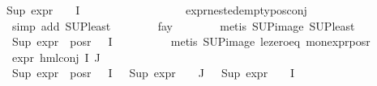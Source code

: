 \begin{isabellebody}
{\isachardoublequoteopen}Sup\ {\isacharparenleft}{\kern0pt}{\isacharparenleft}{\kern0pt}expr{\isacharunderscore}{\kern0pt}{}\ {\isasymcirc}\ {\isasymPhi}{\isacharparenright}{\kern0pt}\ {\isacharbackquote}{\kern0pt}\ I{\isacharparenright}{\kern0pt}\ {\isasymle}\ {}{\isachardoublequoteclose}\isanewline
\ \ \ \ \ \ \isamarkupfalse%
\ {}\isanewline
\ \ \ \ \ \ \isamarkupfalse%
\ expr{\isacharunderscore}{\kern0pt}nested{\isacharunderscore}{\kern0pt}empty{\isacharunderscore}{\kern0pt}pos{\isacharunderscore}{\kern0pt}conj\isanewline
\ \ \ \ \ \ \isamarkupfalse%
\ {\isacharparenleft}{\kern0pt}simp\ add{\isacharcolon}{\kern0pt}\ SUP{\isacharunderscore}{\kern0pt}least{\isacharparenright}{\kern0pt}\isanewline
\ \ \ \ \ \ \isamarkupfalse%
\ fa{\isacharunderscore}{\kern0pt}y\isanewline
\ \ \ \ \ \ \isamarkupfalse%
\ {\isacharparenleft}{\kern0pt}metis\ SUP{\isacharunderscore}{\kern0pt}image\ SUP{\isacharunderscore}{\kern0pt}least{\isacharparenright}{\kern0pt}{\isacharplus}{\kern0pt}\isanewline
\isanewline
\ \ \ \ \isamarkupfalse%
\ {\isachardoublequoteopen}Sup\ {\isacharparenleft}{\kern0pt}expr{\isacharunderscore}{\kern0pt}{}\ {\isacharbackquote}{\kern0pt}\ pos{\isacharunderscore}{\kern0pt}r\ {\isacharparenleft}{\kern0pt}{\isasymPhi}\ {\isacharbackquote}{\kern0pt}\ I{\isacharparenright}{\kern0pt}{\isacharparenright}{\kern0pt}\ {\isasymle}\ {}{\isachardoublequoteclose}\isanewline
\ \ \ \ \ \ \isamarkupfalse%
\ {\isacharparenleft}{\kern0pt}metis\ SUP{\isacharunderscore}{\kern0pt}image\ le{\isacharunderscore}{\kern0pt}zero{\isacharunderscore}{\kern0pt}eq\ mon{\isacharunderscore}{\kern0pt}expr{\isacharunderscore}{\kern0pt}{}{\isacharunderscore}{\kern0pt}pos{\isacharunderscore}{\kern0pt}r{\isacharparenright}{\kern0pt}\isanewline
\isanewline
\ \ \ \ \isamarkupfalse%
\ {\isachardoublequoteopen}expr{\isacharunderscore}{\kern0pt}{}\ {\isacharparenleft}{\kern0pt}hml{\isacharunderscore}{\kern0pt}conj\ I\ J\ {\isasymPhi}{\isacharparenright}{\kern0pt}\ {\isasymle}\ {}{\isachardoublequoteclose}\isanewline
\ \ \ \ \ \ \isamarkupfalse%
\ {\isacartoucheopen}Sup\ {\isacharparenleft}{\kern0pt}expr{\isacharunderscore}{\kern0pt}{}\ {\isacharbackquote}{\kern0pt}\ pos{\isacharunderscore}{\kern0pt}r\ {\isacharparenleft}{\kern0pt}{\isasymPhi}\ {\isacharbackquote}{\kern0pt}\ I{\isacharparenright}{\kern0pt}{\isacharparenright}{\kern0pt}\ {\isasymle}\ {}{\isacartoucheclose}\ {\isacartoucheopen}Sup\ {\isacharparenleft}{\kern0pt}{\isacharparenleft}{\kern0pt}expr{\isacharunderscore}{\kern0pt}{}\ {\isasymcirc}\ {\isasymPhi}{\isacharparenright}{\kern0pt}\ {\isacharbackquote}{\kern0pt}\ J{\isacharparenright}{\kern0pt}\ {\isasymle}\ {}{\isacartoucheclose}\ {\isacartoucheopen}Sup\ {\isacharparenleft}{\kern0pt}{\isacharparenleft}{\kern0pt}expr{\isacharunderscore}{\kern0pt}{}\ {\isasymcirc}\ {\isasymPhi}{\isacharparenright}{\kern0pt}\ {\isacharbackquote}{\kern0pt}\ I{\isacharparenright}{\kern0pt}\ {\isasymle}\ {}{\isacartoucheclose}\isanewline

\end{isabellebody}

